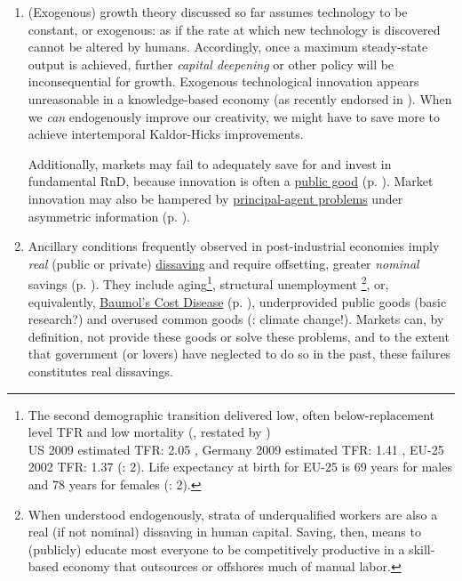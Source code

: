 \begin{enumerate}%
	\item (Exogenous) growth theory discussed so far assumes technology to be constant, or exogenous: as if the rate at which new technology is discovered cannot be altered by humans. Accordingly, once a maximum steady-state output is achieved, further \emph{capital deepening} or other policy will be inconsequential for growth. Exogenous technological innovation appears unreasonable in a knowledge-based economy (as recently endorsed in \citealt{Communities2009}). When we \emph{can} endogenously improve our creativity, we might have to save more to achieve intertemporal Kaldor-Hicks improvements. 

	Additionally, markets may fail to adequately save for and invest in fundamental \gls{RnD}, because innovation is often a \hyperref[sec:public_good]{public good} (p. \pageref{sec:public_good}). Market innovation may also be hampered by \hyperref[sec:principal-agent_problem]{principal-agent problems} under asymmetric information (p. \pageref{sec:principal-agent_problem}). 

	\item Ancillary conditions frequently observed in post-industrial economies imply \emph{real} (public or private) \hyperref[sec:delta_net_worth]{dissaving} and require offsetting, greater \emph{nominal} savings (p. \pageref{sec:delta_net_worth}). They include aging\footnote{
		The second demographic transition delivered low, often below-replacement level \gls{TFR} and low mortality (\citealt{Davis1945}, restated by \citealt{Caldwell-1976-aa}) \\ US 2009 estimated \gls{TFR}: 2.05 \citep{CIA2009}, Germany 2009 estimated \gls{TFR}: 1.41 \citep{CIA2009}, EU-25 2002 \gls{TFR}: 1.37 (\citealt{Demeny-2003-aa}: 2). Life expectancy at birth for EU-25 is 69 years for males and 78 years for females (\citealt{Demeny-2003-aa}: 2).}, 
	structural unemployment \footnote{
		When understood endogenously, strata of underqualified workers are also a real (if not nominal) dissaving in human capital. Saving, then, means to (publicly) educate most everyone to be competitively productive in a skill-based economy that outsources or offshores much of manual labor.}, 
	or, equivalently, \hyperref[it:non-linear_returns]{Baumol's Cost Disease} (p. \pageref{it:non-linear_returns}), underprovided public goods (basic research?) and overused common goods (\citealt{Stern-2006-aa}: climate change!). Markets can, by definition, not provide these goods or solve these problems, and to the extent that government (or lovers) have neglected to do so in the past, these failures constitutes real dissavings.


\end{enumerate}
